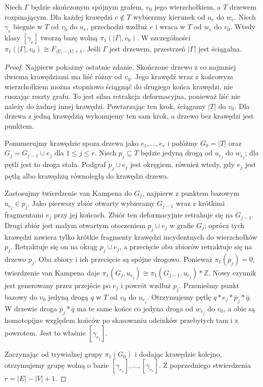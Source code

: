 \begin{twierdzenie}
\label{thm:pi1-graf}
Niech $\Gamma$ będzie skończonym spójnym grafem, $v_0$ jego
wierzchołkiem, a $T$ drzewem rozpinającym. Dla każdej krawędzi
$e\notin T$ wybierzmy kierunek od $u_e$ do $w_e$. Niech
$\gamma_e$ biegnie w $T$ od $v_0$ do $u_e$, przechodzi wzdłuż
$e$ i wraca w $T$ od $w_e$ do $v_0$. Wtedy klasy
$[\gamma_e]$ tworzą bazę wolną $\pi_1(|\Gamma|,v_0)$.
W szczególności
$\pi_1(|\Gamma|,v_0)\cong F_{|E|-|V|+1}$.
Jeśli $\Gamma$ jest drzewem, przestrzeń $|\Gamma|$ jest
ściągalna.
\end{twierdzenie}
\begin{proof}
Najpierw pokażmy ostatnie zdanie. Skończone drzewo z co
najmniej dwiema krawędziami ma liść różny od $v_0$.
Jego krawędź wraz z końcowym wierzchołkiem można
stopniowo ściągnąć do drugiego końca krawędzi, nie ruszając
reszty grafu. To jest silna retrakcja deformacyjna, ponieważ
liść nie należy do żadnej innej krawędzi. Powtarzając ten
krok, ściągamy $|T|$ do $v_0$. Dla drzewa z jedną krawędzią
wykonujemy ten sam krok, a drzewo bez krawędzi jest punktem.

Ponumerujmy krawędzie spoza drzewa jako $e_1,\ldots,e_r$
i połóżmy $G_0=|T|$ oraz
$G_j=G_{j-1}\cup e_j$ dla $1\leq j\leq r$.
Niech $p_j\subseteq T$ będzie jedyną drogą od
$u_{e_j}$ do $w_{e_j}$; dla pętli jest to droga stała.
Podgraf
$p_j\cup e_j$ jest okręgiem, również wtedy, gdy $e_j$
jest pętlą albo krawędzią równoległą do krawędzi drzewa.

Zastosujmy twierdzenie van Kampena do $G_j$, najpierw
z punktem bazowym $u_{e_j}\in p_j$. Jako pierwszy
zbiór otwarty wybieramy $G_{j-1}$ wraz z krótkimi fragmentami
$e_j$ przy jej końcach. Zbiór ten deformacyjnie retrahuje się
na $G_{j-1}$. Drugi zbiór jest małym otwartym otoczeniem
$p_j\cup e_j$ w grafie $G_j$; oprócz tych krawędzi zawiera
tylko krótkie fragmenty krawędzi incydentnych do
wierzchołków $p_j$. Retraktuje się on na okrąg
$p_j\cup e_j$, a przecięcie obu zbiorów retraktuje się
na drzewo $p_j$. Oba zbiory i ich przecięcie są spójne
drogowo. Ponieważ $\pi_1(p_j)=0$, twierdzenie van Kampena
daje $\pi_1(G_j,u_{e_j})\cong
\pi_1(G_{j-1},u_{e_j})*\mathbb Z$.
Nowy czynnik jest generowany przez przejście po $e_j$
i powrót wzdłuż $p_j$. Przenieśmy punkt bazowy do $v_0$
jedyną drogą $q$ w $T$ od $v_0$ do $u_{e_j}$.
Otrzymujemy pętlę $q*e_j*\bar p_j*\bar q$.
W drzewie droga $\bar p_j*\bar q$ ma te same końce co
jedyna droga od $w_{e_j}$ do $v_0$, a obie są homotopijne
względem końców po skasowaniu odcinków przebytych tam
i z powrotem. Jest to właśnie $[\gamma_{e_j}]$.

Zaczynając od trywialnej grupy $\pi_1(G_0)$ i dodając
krawędzie kolejno, otrzymujemy grupę wolną o bazie
$[\gamma_{e_1}],\ldots,[\gamma_{e_r}]$.
Z poprzedniego stwierdzenia $r=|E|-|V|+1$.
\end{proof}

